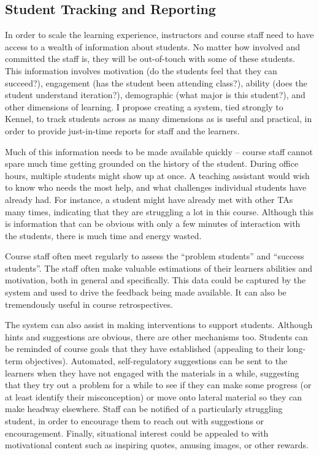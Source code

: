 \subsection{Student Tracking and Reporting}

In order to scale the learning experience, instructors and course staff need to have access to a wealth of information about students.
No matter how involved and committed the staff is, they will be out-of-touch with some of these students.
This information involves motivation (do the students feel that they can succeed?), engagement (has the student been attending class?), ability (does the student understand iteration?), demographic (what major is this student?), and other dimensions of learning.
I propose creating a system, tied strongly to Kennel, to track students across as many dimensions as is useful and practical, in order to provide just-in-time reports for staff and the learners.

Much of this information needs to be made available quickly -- course staff cannot spare much time getting grounded on the history of the student.
During office hours, multiple students might show up at once.
A teaching assistant would wish to know who needs the most help, and what challenges individual students have already had.
For instance, a student might have already met with other TAs many times, indicating that they are struggling a lot in this course.
Although this is information that can be obvious with only a few minutes of interaction with the students, there is much time and energy wasted.

Course staff often meet regularly to assess the ``problem students'' and ``success students''.
The staff often make valuable estimations of their learners abilities and motivation, both in general and specifically.
This data could be captured by the system and used to drive the feedback being made available.
It can also be tremendously useful in course retrospectives.

The system can also assist in making interventions to support students.
Although hints and suggestions are obvious, there are other mechanisms too.
Students can be reminded of course goals that they have established (appealing to their long-term objectives).
Automated, self-regulatory suggestions can be sent to the learners when they have not engaged with the materials in a while, suggesting that they try out a problem for a while to see if they can make some progress (or at least identify their misconception) or move onto lateral material so they can make headway elsewhere.
Staff can be notified of a particularly struggling student, in order to encourage them to reach out with suggestions or encouragement.
Finally, situational interest could be appealed to with motivational content such as inspiring quotes, amusing images, or other rewards.

